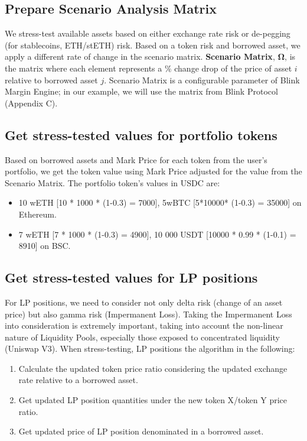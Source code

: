 \documentclass[conference]{IEEEtran}
\begin{document}
\subsection{Prepare Scenario Analysis Matrix}
We stress-test available assets based on either exchange rate risk or de-pegging (for stablecoins, ETH/stETH) risk. Based on a token risk and borrowed asset, we apply a different rate of change in the scenario matrix. \textbf{Scenario Matrix}, $\boldsymbol{\Omega}$, is the matrix where each element represents a $\%$ change drop of the price of asset $i$ relative to borrowed asset $j$. Scenario Matrix is a configurable parameter of Blink Margin Engine; in our example, we will use the matrix from Blink Protocol (Appendix C).



\subsection{Get stress-tested values for portfolio tokens}
Based on borrowed assets and Mark Price for each token from the user’s portfolio, we get the token value using Mark Price adjusted for the value from the Scenario Matrix. The portfolio token’s values in USDC are:
\begin{itemize}
	\item 10 wETH [10 * 1000 * (1-0.3) = 7000], 5wBTC [5*10000* (1-0.3) = 35000] on Ethereum.
	\item 7 wETH [7 * 1000 * (1-0.3) = 4900], 10 000 USDT [10000 * 0.99 * (1-0.1) = 8910] on BSC.
\end{itemize}


\subsection{Get stress-tested values for LP positions}
For LP positions, we need to consider not only delta risk (change of an asset price) but also gamma risk (Impermanent Loss). Taking the Impermanent Loss into consideration is extremely important, taking into account the non-linear nature of Liquidity Pools, especially those exposed to concentrated liquidity (Uniswap V3). When stress-testing, LP positions the algorithm in the following: 
\begin{enumerate}
	\item Calculate the updated token price ratio considering the updated exchange rate relative to a borrowed asset. 
	\item Get updated LP position quantities under the new token X/token Y price ratio.
	\item Get updated price of LP position denominated in a borrowed asset.
\end{enumerate}
\end{document}
